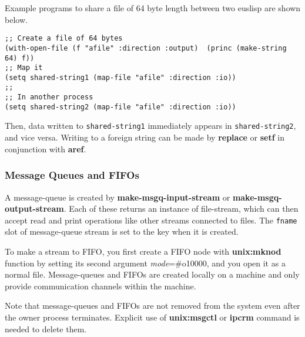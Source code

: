 Example programs to share a file of 64 byte length between two
euslisp are shown below.

\begin{verbatim}
;; Create a file of 64 bytes
(with-open-file (f "afile" :direction :output)  (princ (make-string 64) f))
;; Map it
(setq shared-string1 (map-file "afile" :direction :io))
;;
;; In another process
(setq shared-string2 (map-file "afile" :direction :io))
\end{verbatim}

Then, data written to {\tt shared-string1}
immediately appears in {\tt shared-string2}, and vice versa.
Writing to a foreign string can be made by 
{\bf replace} or {\bf setf} in conjunction with {\bf aref}.

\begin{refdesc}

\end{refdesc}

\subsubsection{Message Queues and FIFOs}
A message-queue is created by {\bf make-msgq-input-stream} or {\bf make-msgq-output-stream}.
Each of these returns an instance of file-stream, which can then
accept read and print operations like other streams connected to files.
The {\tt fname} slot of message-queue stream is set to the key when it is
created.

To make a stream to FIFO,
you first create a FIFO node with {\bf unix:mknod} function
by setting its second argument {\em mode}=\#o10000,
and you open it as a normal file.
Message-queues and FIFOs are created locally on a machine and
only provide communication channels within the machine.

Note that message-queues and FIFOs are not removed from the system
even after the owner process terminates.
Explicit use of {\bf unix:msgctl} or {\bf ipcrm} command
is needed to delete them.

\begin{refdesc}



\end{refdesc}

